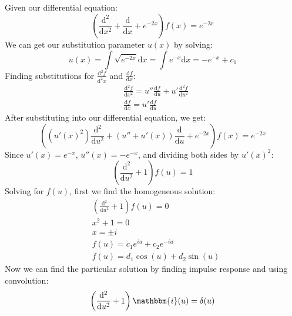 \documentclass[12pt]{article}
\begin{document}
\subsection{}
Given our differential equation:
\begin{equation}
    \left(\frac{\mathrm{d}^2}{\mathrm{d}x^2}+ \frac{\mathrm{d}}{\mathrm{d}x} + e^{-2x}\right)f(x) = e^{-2x}
\end{equation}
We can get our substitution parameter $u(x)$ by solving:
\begin{equation}
    \label{eq:subpar}
    u(x) = \int\sqrt{e^{-2x}}\mathrm{d}x = \int e^{-x}\mathrm{d}x = -e^{-x} + c_1
\end{equation}
Finding substitutions for $\frac{\mathrm{d}^2f}{\mathrm{d}^2x}$ and $\frac{\mathrm{d}f}{\mathrm{d}x}$:
\begin{equation}
    \begin{split}
        &\frac{\mathrm{d}^2f}{\mathrm{d}x^2} = u''\frac{\mathrm{d}f}{\mathrm{d}u} + u'\frac{\mathrm{d}^2f}{\mathrm{d}u^2}\\
        &\frac{\mathrm{d}f}{\mathrm{d}x} = u'\frac{\mathrm{d}f}{\mathrm{d}u}        
    \end{split}
\end{equation}
After substituting into our differential equation, we get:
\begin{equation}
    \left(\left(u'(x)^2\right)\frac{\mathrm{d}^2}{\mathrm{d}u^2}+\left(u''+u'(x)\right)\frac{\mathrm{d}}{\mathrm{d}u}+e^{-2x}\right)f(x) = e^{-2x}
\end{equation}
Since $u'(x) = e^{-x}$, $u''(x) = -e^{-x}$, and dividing both sides by $u'(x)^2$:
\begin{equation}
    \left(\frac{\mathrm{d}^2}{\mathrm{d}u^2}+1\right)f(u) = 1
\end{equation}
Solving for $f(u)$, first we find the homogeneous solution:
\begin{equation}
    \begin{split}
        &\left(\frac{\mathrm{d}^2}{\mathrm{d}u^2}+1\right)f(u) = 0\\
        &x^2 +1 = 0\\
        &x = \pm i\\
        &f(u) = c_1e^{iu} + c_2e^{-iu}\\
        &f(u) = d_1\cos(u) + d_2\sin(u)
    \end{split}
\end{equation}
Now we can find the particular solution by finding impulse response and using convolution:
\begin{equation}
    \left(\frac{\mathrm{d}^2}{\mathrm{d}u^2}+1\right)\mathbbm{i}(u) = \delta(u)
\end{equation}
\end{document}

